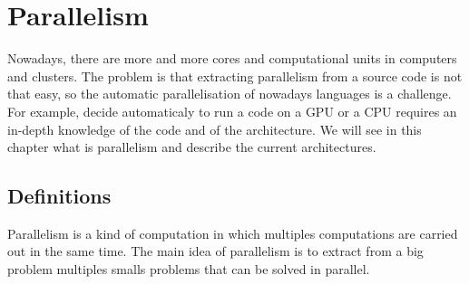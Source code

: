\chapter{Parallelism}\label{ch:Parallelism}
Nowadays, there are more and more cores and computational units in computers and clusters. The problem is that extracting parallelism from a source code is not that easy, so the automatic parallelisation of nowadays languages is a challenge. For example, decide automaticaly to run a code on a \ac{GPU} or a \ac{CPU} requires an in-depth knowledge of the code and of the architecture. We will see in this chapter what is parallelism and describe the current architectures.

\section{Definitions}
Parallelism is a kind of computation in which multiples computations are carried out in the same time. The main idea of parallelism is to extract from a big problem multiples smalls problems that can be solved in parallel. 


